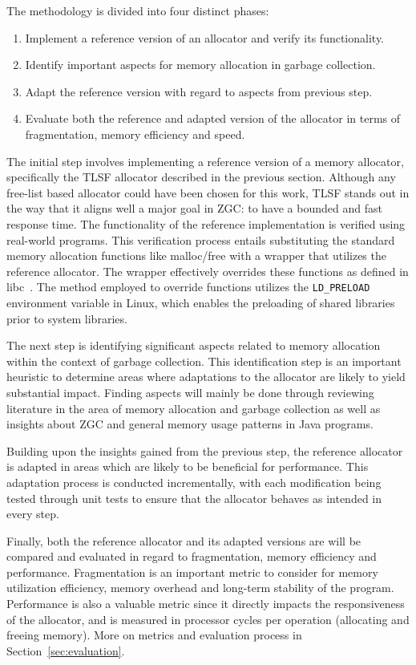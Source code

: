 
The methodology is divided into four distinct phases:

\begin{enumerate}
    \item Implement a reference version of an allocator and verify its functionality.
    \item Identify important aspects for memory allocation in garbage collection.
    \item Adapt the reference version with regard to aspects from previous step.
    \item Evaluate both the reference and adapted version of the allocator in terms of fragmentation, memory efficiency and speed.
\end{enumerate}

The initial step involves implementing a reference version of a memory allocator, specifically the TLSF allocator described in the previous section. Although any free-list based allocator could have been chosen for this work, TLSF stands out in the way that it aligns well a major goal in ZGC: to have a bounded and fast response time. The functionality of the reference implementation is verified using real-world programs. This verification process entails substituting the standard memory allocation functions like malloc/free with a wrapper that utilizes the reference allocator. The wrapper effectively overrides these functions as defined in libc~\cite{mallocman}. The method employed to override functions utilizes the \texttt{LD\_PRELOAD} environment variable in Linux, which enables the preloading of shared libraries prior to system libraries.

The next step is identifying significant aspects related to memory allocation within the context of garbage collection. This identification step is an important heuristic to determine areas where adaptations to the allocator are likely to yield substantial impact. Finding aspects will mainly be done through reviewing literature in the area of memory allocation and garbage collection as well as insights about ZGC and general memory usage patterns in Java programs.

Building upon the insights gained from the previous step, the reference allocator is adapted in areas which are likely to be beneficial for performance. This adaptation process is conducted incrementally, with each modification being tested through unit tests to ensure that the allocator behaves as intended in every step.

Finally, both the reference allocator and its adapted versions are will be compared and evaluated in regard to fragmentation, memory efficiency and performance. Fragmentation is an important metric to consider for memory utilization efficiency, memory overhead and long-term stability of the program. Performance is also a valuable metric since it directly impacts the responsiveness of the allocator, and is measured in processor cycles per operation (allocating and freeing memory). More on metrics and evaluation process in Section~\ref{sec:evaluation}.

